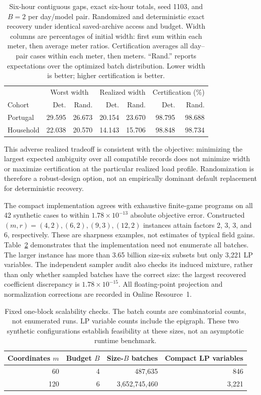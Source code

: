 \documentclass[12pt]{article}
\begin{document}
\begin{table}[htbp]\centering\small
\caption{Six-hour contiguous gaps, exact six-hour totals, seed 1103, and $B=2$ per day/model pair. Randomized and deterministic exact recovery under identical saved-archive
access and budget. Width columns are percentages of initial width: first sum
within each meter, then average meter ratios. Certification averages all
day--pair cases within each meter, then meters. ``Rand.'' reports expectations
over the optimized batch distribution. Lower width is better; higher
certification is better.}\label{tab:random-results}
\begin{tabular}{lrrrrrr}\toprule
&\multicolumn{2}{c}{Worst width}&\multicolumn{2}{c}{Realized width}&\multicolumn{2}{c}{Certification (\%)}\\
Cohort&Det.&Rand.&Det.&Rand.&Det.&Rand.\\\midrule
Portugal & 29.595 & 26.673 & 20.154 & 23.670 & 98.795 & 98.688 \\
Household & 22.038 & 20.570 & 14.143 & 15.706 & 98.848 & 98.734 \\
\bottomrule\end{tabular}\end{table}

This adverse realized tradeoff is consistent with the objective: minimizing
the largest expected ambiguity over all compatible records does not
minimize width or maximize certification at the particular realized load
profile. Randomization is therefore a robust-design option, not an
empirically dominant default replacement for deterministic recovery.

The compact implementation agrees with exhaustive finite-game programs on
all 42 synthetic cases to within $1.78\times10^{-13}$ absolute objective
error. Constructed $(m,r)=(4,2),(6,2),(9,3),(12,2)$ instances attain factors
2, 3, 3, and 6, respectively. These are sharpness examples, not estimates
of typical field gains. Table~\ref{tab:compact-scale} demonstrates that the
implementation need not enumerate all batches. The larger instance has
more than 3.65 billion size-six subsets but only 3,221 LP variables.
The independent sampler audit also checks its induced mixture, rather than
only whether sampled batches have the correct size: the largest recovered
coefficient discrepancy is $1.78\times10^{-15}$. All floating-point
projection and normalization corrections are recorded in Online Resource~1.

\begin{table}[htbp]\centering\small
\caption{Fixed one-block scalability checks. The batch counts are combinatorial
counts, not enumerated runs. LP variable counts include the epigraph. These
two synthetic configurations establish feasibility at these sizes, not an
asymptotic runtime benchmark.}\label{tab:compact-scale}
\begin{tabular}{rrrr}\toprule
Coordinates $m$&Budget $B$&Size-$B$ batches&Compact LP variables\\\midrule
60 & 4 & 487,635 & 846 \\
120 & 6 & 3,652,745,460 & 3,221 \\
\bottomrule\end{tabular}\end{table}
\end{document}
